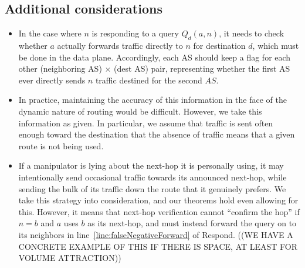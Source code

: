 \documentclass[10pt]{article}
\begin{document}
  \subsection{Additional considerations}
  \begin{itemize}
    \item In the case where $n$ is responding to a query $Q_d(a,n)$, it needs to
      check whether $a$ actually forwards traffic directly to $n$ for
      destination $d$, which must be done in the data plane. Accordingly, each
      AS should keep a flag for each other (neighboring AS) $\times$ (dest AS)
      pair, representing whether the first AS ever directly sends $n$ traffic
      destined for the second $AS$.
    \item In practice, maintaining the accuracy of this information in the
      face of the dynamic nature of routing would be difficult.
      However, we take this information as given.
      In particular, we assume that traffic is sent often enough toward the
      destination that the absence of traffic means that a given route is not
      being used. 
    \item If a manipulator is lying about the next-hop it is personally using,
      it may intentionally send occasional traffic towards its announced
      next-hop, while sending the bulk of its traffic down the route that it
      genuinely prefers. We take this strategy into consideration, and our
      theorems hold even allowing for this. However, it means that next-hop
      verification cannot ``confirm the hop'' if $n=b$ and $a$ uses $b$ as
      its next-hop, and must instead forward the query on to its neighbors
      in line~\ref{line:falseNegativeForward} of {\sc Respond}.
      ((WE HAVE A CONCRETE EXAMPLE OF THIS IF THERE IS SPACE,
      AT LEAST FOR VOLUME ATTRACTION))
  \end{itemize}
\end{document}

